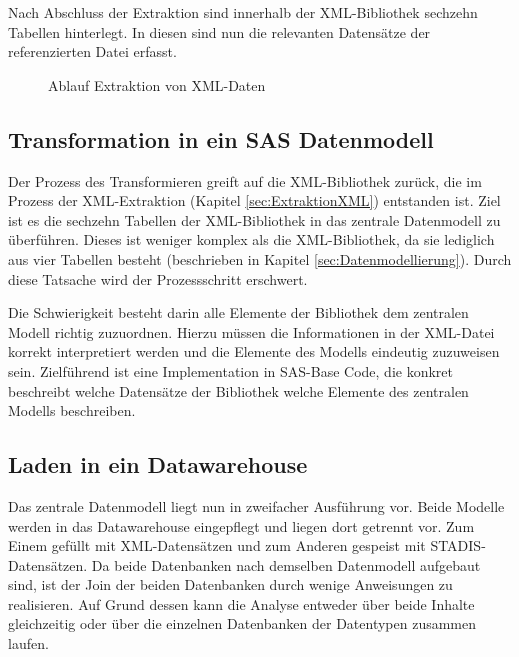 		Nach Abschluss der Extraktion sind innerhalb der XML-Bibliothek sechzehn Tabellen hinterlegt.
		In diesen sind nun die relevanten Datensätze der referenzierten Datei erfasst.
		\begin{figure}[htbp]
			\caption{Ablauf Extraktion von XML-Daten}
			\label{fig:ProzessExtraktionXML}
		\end{figure}
	\subsection{Transformation in ein SAS Datenmodell}
		Der Prozess des Transformieren greift auf die XML-Bibliothek zurück, die im Prozess der XML-Extraktion (Kapitel \ref{sec:ExtraktionXML}) entstanden ist.
		Ziel ist es die sechzehn Tabellen der XML-Bibliothek in das zentrale Datenmodell zu überführen.
		Dieses ist weniger komplex als die XML-Bibliothek, da sie lediglich aus vier Tabellen besteht (beschrieben in Kapitel \ref{sec:Datenmodellierung}).
		Durch diese Tatsache wird der Prozessschritt erschwert.
		
		Die Schwierigkeit besteht darin alle Elemente der Bibliothek dem zentralen Modell richtig zuzuordnen.
		Hierzu müssen die Informationen in der XML-Datei korrekt interpretiert werden und die Elemente des Modells eindeutig zuzuweisen sein.
		Zielführend ist eine Implementation in SAS-Base Code, die konkret beschreibt welche Datensätze der Bibliothek welche Elemente des zentralen Modells beschreiben.
	
	\subsection{Laden in ein Datawarehouse}
		Das zentrale Datenmodell liegt nun in zweifacher Ausführung vor.
		Beide Modelle werden in das Datawarehouse eingepflegt und liegen dort getrennt vor.
		Zum Einem gefüllt mit XML-Datensätzen und zum Anderen gespeist mit STADIS-Datensätzen.
		Da beide Datenbanken nach demselben Datenmodell aufgebaut sind, ist der Join der beiden Datenbanken durch wenige Anweisungen zu realisieren.
		Auf Grund dessen kann die Analyse entweder über beide Inhalte gleichzeitig oder über die einzelnen Datenbanken der Datentypen zusammen laufen.